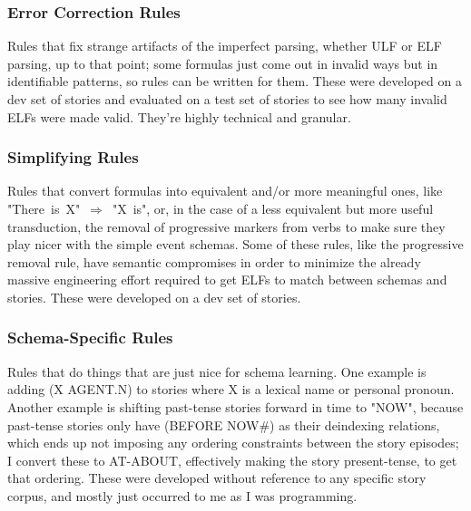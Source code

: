 \subsubsection{Error Correction Rules}
Rules that fix strange artifacts of the imperfect parsing, whether ULF or ELF parsing, up to that point; some formulas just come out in invalid ways but in identifiable patterns, so rules can be written for them. These were developed on a dev set of stories and evaluated on a test set of stories to see how many invalid ELFs were made valid. They're highly technical and granular.

\subsubsection{Simplifying Rules}
Rules that convert formulas into equivalent and/or more meaningful ones, like "There~is~X"~$\Rightarrow$~"X~is", or, in the case of a less equivalent but more useful transduction, the removal of progressive markers from verbs to make sure they play nicer with the simple event schemas. Some of these rules, like the progressive removal rule, have semantic compromises in order to minimize the already massive engineering effort required to get ELFs to match between schemas and stories. These were developed on a dev set of stories.

\subsubsection{Schema-Specific Rules}
Rules that do things that are just nice for schema learning. One example is adding (X AGENT.N) to stories where X is a lexical name or personal pronoun. Another example is shifting past-tense stories forward in time to "NOW", because past-tense stories only have (BEFORE NOW\#) as their deindexing relations, which ends up not imposing any ordering constraints between the story episodes; I convert these to AT-ABOUT, effectively making the story present-tense, to get that ordering. These were developed without reference to any specific story corpus, and mostly just occurred to me as I was programming.

